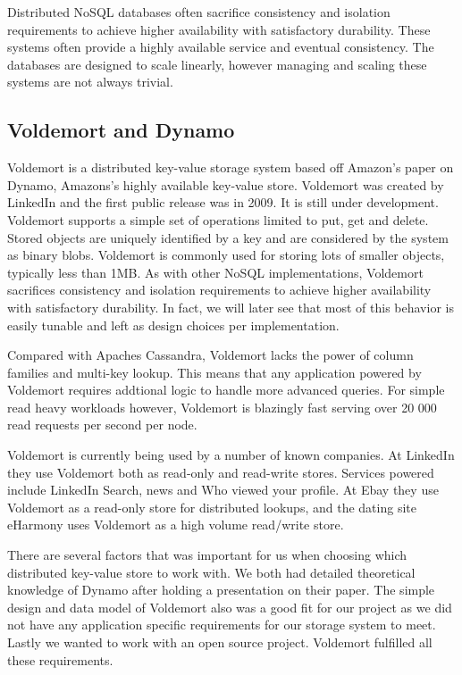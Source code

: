 Distributed NoSQL databases often sacrifice consistency and isolation requirements to achieve higher availability with satisfactory durability. These systems often provide a highly available service and eventual consistency.
The databases are designed to scale linearly, however managing and scaling these systems are not always trivial\cite{tellybug}. 


\subsection{Voldemort and Dynamo}
Voldemort is a distributed key-value storage system based off Amazon's paper on Dynamo, Amazons's highly available key-value store. Voldemort was created by LinkedIn and the first public release was in 2009. It is still under development. Voldemort supports a simple set of operations limited to put, get and delete. Stored objects are uniquely identified by a key and are considered by the system as binary blobs. Voldemort is commonly used for storing lots of smaller objects, typically less than 1MB.  As with other NoSQL implementations, Voldemort sacrifices consistency and isolation requirements to achieve higher availability with satisfactory durability. In fact, we will later see that most of this behavior is easily tunable and left as design choices per implementation.

Compared with Apaches Cassandra, Voldemort lacks the power of column families and multi-key lookup. This means that any application powered by Voldemort requires addtional logic to handle more advanced queries. For simple read heavy workloads however, Voldemort is blazingly fast serving over 20 000 read requests per second per node. 

Voldemort is currently being used by a number of known companies. At LinkedIn they use Voldemort both as read-only and read-write stores. Services powered include LinkedIn Search, news and Who viewed your profile. At Ebay they use Voldemort as a read-only store for distributed lookups, and the dating site eHarmony uses Voldemort as a high volume read/write store.

There are several factors that was important for us when choosing which distributed key-value store to work with. We both had detailed theoretical knowledge of Dynamo after holding a presentation on their paper. The simple design and data model of Voldemort also was a good fit for our project as we did not have any application specific requirements for our storage system to meet. Lastly we wanted to work with an open source project. Voldemort fulfilled all these requirements. 

